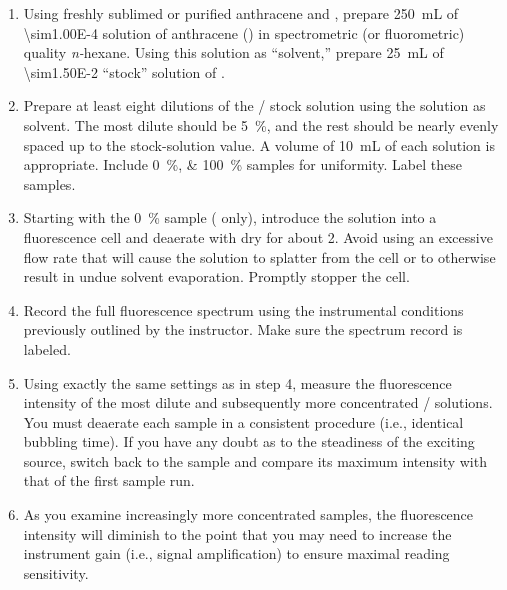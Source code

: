 \begin{enumerate}
	\item Using freshly sublimed or purified anthracene and , prepare \SI{250}{\mL} of \SI{\sim1.00E-4}{\Molar} solution of anthracene () in spectrometric (or fluorometric) quality \emph{n-}hexane. 
	Using this solution as ``solvent,'' prepare \SI{25}{\mL} of \SI{\sim1.50E-2}{\Molar} ``stock'' solution of .
	\item Prepare at least eight dilutions of the / stock solution using the  solution as solvent.
	The most dilute should be \SI{5}{\percent}, and the rest should be nearly evenly spaced up to the stock-solution value. 
	A volume of \SI{10}{\mL} of each solution is appropriate. 
	Include \SIlist{0;100}{\percent} samples for uniformity. 
	Label these samples.
	\item Starting with the \SI{0}{\percent} sample ( only), introduce the solution into a fluorescence cell and deaerate with dry  for about \SI{2}{\min}. 
	Avoid using an excessive flow rate that will cause the solution to splatter from the cell or to otherwise result in undue solvent evaporation. 
	Promptly stopper the cell.
	\item Record the full fluorescence spectrum using the instrumental conditions previously outlined by the instructor.
	Make sure the spectrum record is labeled.
	\item Using exactly the same settings as in step 4, measure the  fluorescence intensity of the most dilute and subsequently more concentrated / solutions. 
	You must deaerate each sample in a consistent procedure (i.e., identical bubbling time). 
	If you have any doubt as to the steadiness of the exciting source, switch back to the  sample and compare its maximum intensity with that of the first sample run.
	\item As you examine increasingly more concentrated samples, the fluorescence intensity will diminish to the point that you may need to increase the instrument gain (i.e., signal amplification) to ensure maximal reading sensitivity. 

\end{enumerate}
